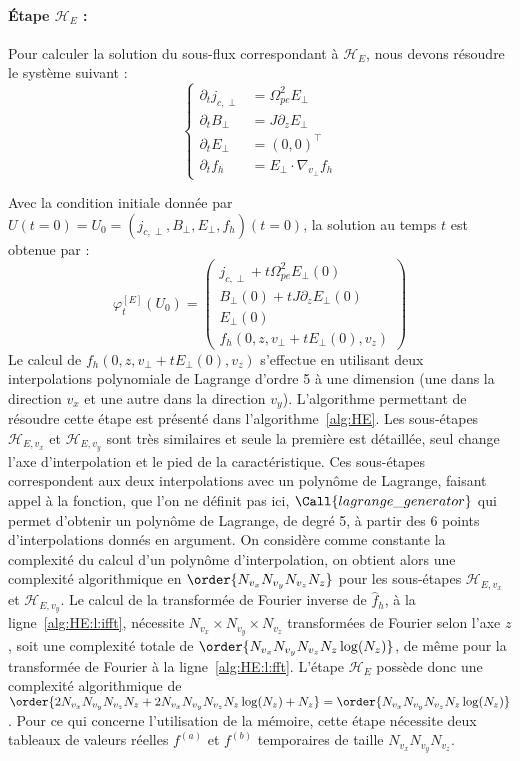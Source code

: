 \paragraph{Étape $\mathcal{H}_E$ :}
Pour calculer la solution du sous-flux correspondant à $\mathcal{H}_E$, nous devons résoudre le système suivant :
$$
  \begin{cases}
    \partial_t j_{c,\perp} &= \Omega_{pe}^2E_{\perp} \\
    \partial_t B_\perp     &= J\partial_zE_\perp \\
    \partial_t E_\perp     &= (0,0)^\top \\
    \partial_t f_h         &= E_\perp\cdot\nabla_{v_\perp}f_h
  \end{cases}
$$

Avec la condition initiale donnée par $U(t=0)=U_0=(j_{c,\perp},B_\perp,E_\perp,f_h)(t=0)$, la solution au temps $t$ est obtenue par :
$$
  \varphi_t^{[E]}(U_0) = \begin{pmatrix}
    j_{c,\perp} + t\Omega_{pe}^2E_{\perp}(0)\\
    B_\perp(0)+tJ\partial_zE_\perp(0) \\
    E_\perp(0) \\
    f_h(0,z,v_\perp+tE_\perp(0),v_z)
  \end{pmatrix}
$$
Le calcul de $f_h(0,z,v_\perp+tE_\perp(0),v_z)$ s'effectue en utilisant deux interpolations polynomiale de Lagrange d'ordre 5 à une dimension (une dans la direction $v_x$ et une autre dans la direction $v_y$). L'algorithme permettant de résoudre cette étape est présenté dans l'algorithme~\ref{alg:HE}. Les sous-étapes $\mathcal{H}_{E,v_x}$ et $\mathcal{H}_{E,v_y}$ sont très similaires et seule la première est détaillée, seul change l'axe d'interpolation et le pied de la caractéristique. Ces sous-étapes correspondent aux deux interpolations avec un polynôme de Lagrange, faisant appel à la fonction, que l'on ne définit pas ici, $\Call{lagrange\_generator}$ qui permet d'obtenir un polynôme de Lagrange, de degré 5, à partir des 6 points d'interpolations donnés en argument. On considère comme constante la complexité du calcul d'un polynôme d'interpolation, on obtient alors une complexité algorithmique en $\order{N_{v_x}N_{v_y}N_{v_z}N_z}$ pour les sous-étapes $\mathcal{H}_{E,{v_x}}$ et $\mathcal{H}_{E,{v_y}}$. Le calcul de la transformée de Fourier inverse de $\hat{f}_h$, à la ligne~\ref{alg:HE:l:ifft}, nécessite $N_{v_x}\times N_{v_y}\times N_{v_z}$ transformées de Fourier selon l'axe $z$, soit une complexité totale de $\order{N_{v_x}N_{v_y}N_{v_z}N_z\log(N_z)}$, de même pour la transformée de Fourier à la ligne~\ref{alg:HE:l:fft}. L'étape $\mathcal{H}_{E}$ possède donc une complexité algorithmique de $\order{2N_{v_x}N_{v_y}N_{v_z}N_z + 2N_{v_x}N_{v_y}N_{v_z}N_z\log(N_z) + N_z} = \order{N_{v_x}N_{v_y}N_{v_z}N_z\log(N_z)}$. Pour ce qui concerne l'utilisation de la mémoire, cette étape nécessite deux tableaux de valeurs réelles $f^{(a)}$ et $f^{(b)}$ temporaires de taille $N_{v_x}N_{v_y}N_{v_z}$.
